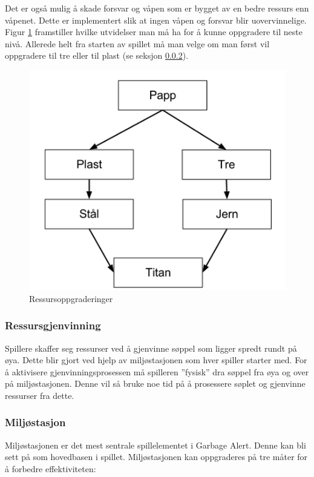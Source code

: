 Det er også mulig å skade forsvar og våpen som er bygget av en bedre ressurs enn våpenet. Dette er implementert slik at ingen våpen og forsvar blir uovervinnelige. Figur \ref{fig:ressursoppgraderinger} framstiller hvilke utvidelser man må ha for å kunne oppgradere til neste nivå. Allerede helt fra starten av spillet må man velge om man først vil oppgradere til tre eller til plast (se seksjon \ref{miljostasjon}). 

\begin{figure} [H]
	\begin{center}
	\includegraphics[scale=0.5]{images/oppgraderingstre}
	\end{center}
	\caption{Ressursoppgraderinger}
	\label{fig:ressursoppgraderinger}
\end{figure}

\subsubsection{Ressursgjenvinning}
Spillere skaffer seg ressurser ved å gjenvinne søppel som ligger
spredt rundt på øya. Dette blir gjort ved hjelp av miljøstasjonen
som hver spiller starter med. For å aktivisere gjenvinningsprosessen må spilleren ''fysisk'' dra søppel fra øya og over på miljøstasjonen. Denne vil så bruke noe tid på å prosessere søplet og gjenvinne ressurser fra dette.


\subsubsection{Miljøstasjon} \label{miljostasjon}
Miljøstasjonen er det mest sentrale spillelementet i Garbage
Alert. Denne kan bli sett på som hovedbasen i spillet.
Miljøstasjonen kan oppgraderes på tre måter for å forbedre effektiviteten:

